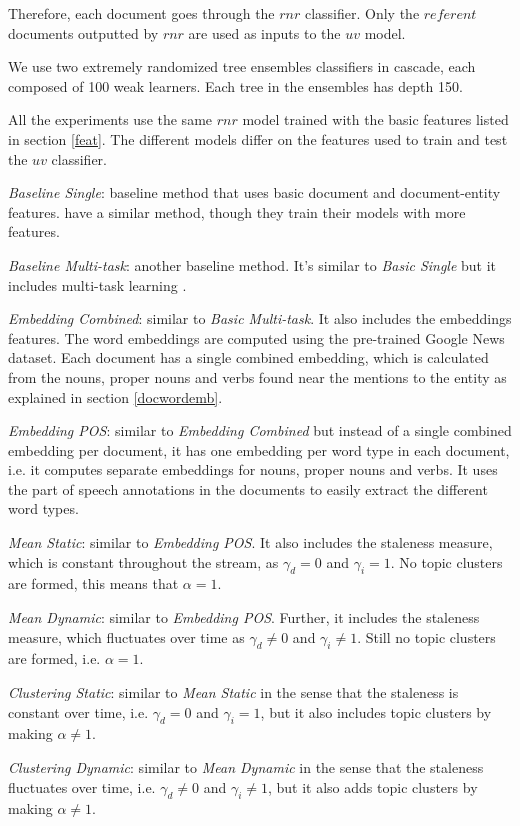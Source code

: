 \documentclass{article}
\begin{document}
Therefore, each document goes through the $rnr$ classifier. Only the $referent$ documents outputted by $rnr$ are used as inputs to the $uv$ model.

We use two extremely randomized tree ensembles classifiers \cite{GEW06a} in cascade, each composed of 100 weak learners. Each tree in the ensembles has depth 150.

All the experiments use the same $rnr$ model trained with the basic features listed in section \ref{feat}. 
The different models differ on the features used to train and test the $uv$ classifier.

\begin{itemize*}
  \item {\textit{Baseline Single}}: baseline method that uses basic document and document-entity features. \citet{jingang13, bellogin13} have a similar method, though they train their models with more features.
  \item {\textit{Baseline Multi-task}}: another baseline method. It's similar to {\textit{Basic Single}} but it includes multi-task learning \cite{Caruana93multitasklearning}.
  \item {\textit{Embedding Combined}}: similar to {\textit{Basic Multi-task}}. It also includes the embeddings features. The word embeddings are computed using the pre-trained Google News dataset. Each document has a single combined embedding, which is calculated from the nouns, proper nouns and verbs found near the mentions to the entity as explained in section \ref{docwordemb}.
  \item {\textit{Embedding POS}}: similar to {\textit{Embedding Combined}} but instead of a single combined embedding per document, it has one embedding per word type in each document, i.e. it computes separate embeddings for nouns, proper nouns and verbs. It uses the part of speech annotations in the documents to easily extract the different word types.
  \item {\textit{Mean Static}}: similar to {\textit{Embedding POS}}. It also includes the staleness measure, which is constant throughout the stream, as $\gamma_d = 0$ and $\gamma_i = 1$. No topic clusters are formed, this means that $\alpha = 1$.
  \item {\textit{Mean Dynamic}}: similar to {\textit{Embedding POS}}. Further, it includes the staleness measure, which fluctuates over time as $\gamma_d \neq 0$ and $\gamma_i \neq 1$. Still no topic clusters are formed, i.e. $\alpha = 1$.
  \item {\textit{Clustering Static}}: similar to {\textit{Mean Static}} in the sense that the staleness is constant over time, i.e. $\gamma_d = 0$ and $\gamma_i = 1$, but it also includes topic clusters by making $\alpha \neq 1$.
  \item {\textit{Clustering Dynamic}}: similar to {\textit{Mean Dynamic}} in the sense that the staleness fluctuates over time, i.e. $\gamma_d \neq 0$ and $\gamma_i \neq 1$, but it also adds topic clusters by making $\alpha \neq 1$.
\end{itemize*}
\end{document}

